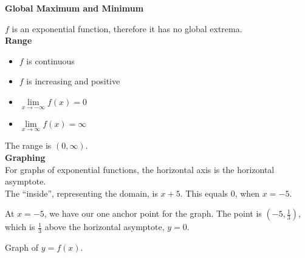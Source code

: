 \documentclass{ximera}
\begin{document}
\begin{example}
\textbf{Global Maximum and Minimum}

$f$ is an exponential function, therefore it has no global extrema. \\





\textbf{Range}

 
\begin{itemize}
\item $f$ is continuous
\item $f$ is increasing and positive
\item $\lim\limits_{x \to -\infty} f(x) = 0$
\item $\lim\limits_{x \to \infty} f(x) = \infty$
\end{itemize}


The range is $(0, \infty)$. \\





\textbf{\textcolor{purple!85!blue}{Graphing}} \\

For graphs of exponential functions, the horizontal axis is the horizontal asymptote.  \\



The ``inside'', representing the domain, is $x+5$.  This equals $0$, when $x=-5$.  

At $x=-5$, we have our one anchor point for the graph.  The point is $\left(-5, \frac{1}{3} \right)$, which is $\frac{1}{3}$ above the horizontal asymptote, $y = 0$.


Graph of $y = f(x)$.

\begin{image}
\end{image}
\end{example}
\end{document}
